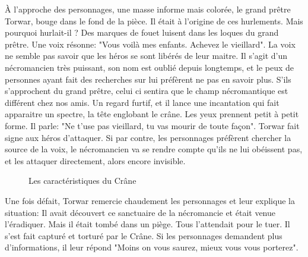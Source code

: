 \documentclass[a4paper, 11pt]{article}
\begin{document}
À l'approche des personnages, une masse informe mais colorée, le grand prêtre Torwar, bouge dans le fond de la pièce. Il était à l'origine de ces hurlements. Mais pourquoi hurlait-il ? Des marques de fouet luisent dans les loques du grand prêtre.
Une voix résonne: "Vous voilà mes enfants. Achevez le vieillard". La voix ne semble pas savoir que les héros se sont libérés de leur maitre. Il s'agit d'un nécromancien très puissant, son nom est oublié depuis longtemps, et le peux de personnes ayant fait des recherches sur lui préfèrent ne pas en savoir plus.
\newline
S'ils s'approchent du grand prêtre, celui ci sentira que le champ nécromantique est différent chez nos amis. Un regard furtif, et il lance une incantation qui fait apparaitre un spectre, la tête englobant le crâne. Les yeux prennent petit à petit forme. Il parle: "Ne t'use pas vieillard, tu vas mourir de toute façon". Torwar fait signe aux héros d'attaquer.
\newline
Si par contre, les personnages préfèrent chercher la source de la voix, le nécromancien va se rendre compte qu'ils ne lui obéissent pas, et les attaquer directement, alors encore invisible.
\newline
\begin{figure}[ht]
\begin{center}
\caption{Les caractéristiques du Crâne}
\end{center}
\end{figure}
Une fois défait, Torwar remercie chaudement les personnages et leur explique la situation: Il avait découvert ce sanctuaire de la nécromancie et était venue l'éradiquer. Mais il était tombé dans un piège. Tous l'attendait pour le tuer. Il s'est fait capturé et torturé par le Crâne. Si les personnages demandent plus d'informations, il leur répond "Moins on vous saurez, mieux vous vous porterez".
\end{document}
